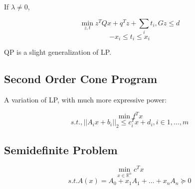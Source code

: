 \documentclass[10pt]{article}
\begin{document}
If $\lambda \ne 0$,

$$
\min_{z, t} z^T Q x + q^Tz + \sum_i t_i, Gz \le d
$$
$$
-x_i \le t_i \le x_i
$$

QP is a slight generalization of LP.

\subsection{Second Order Cone Program}

A variation of LP, with much more expressive power:

$$
\min f^Tx
$$
$$
s.t., ||A_i x + b_i||_2 \le c_i^T x + d_i, i \in 1, \ldots, m
$$

\subsection{Semidefinite Problem}

$$
\min_{x \in \mathbb{R}^n} c^T x
$$
$$
s.t. A(x) = A_0 + x_1 A_1 + \ldots + x_n A_n \succeq 0
$$
\end{document}
